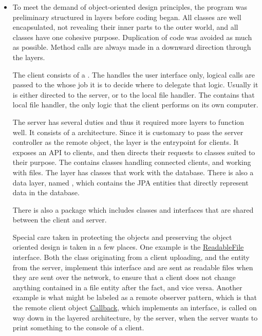 \documentclass[a4paper]{scrartcl}
\begin{document}
\begin{itemize}
    \item To meet the demand of object-oriented design principles, the program was preliminary structured in layers before coding began. All classes are well encapsulated, not revealing their inner parts to the outer world, and all classes have one cohesive purpose. Duplication of code was avoided as much as possible. Method calls are always made in a downward direction through the layers.

        The client consists of a . The  handles the user interface only, logical calls are passed to the  whose job it is to decide where to delegate that logic. Usually it is either directed to the server, or to the local file handler. The  contains that local file handler, the only logic that the client performs on its own computer.

        The server has several duties and thus it required more layers to function well. It consists of a  architecture. Since it is customary to pass the server controller as the remote object, the  layer is the entrypoint for clients. It exposes an API to clients, and then directs their requests to classes suited to their purpose. The  contains classes handling connected clients, and working with files. The  layer has classes that work with the database. There is also a data layer, named , which contains the JPA entities that directly represent data in the database.

        There is also a  package which includes classes and interfaces that are shared between the client and server.

        Special care taken in protecting the objects and preserving the object oriented design is taken in a few places. One example is the \href{https://github.com/fongie/Filehandler/blob/master/common/common/ReadableFile.java}{ReadableFile} interface. Both the  class originating from a client uploading, and the  entity from the server, implement this interface and are sent as readable files when they are sent over the network, to ensure that a client does not change anything contained in a file entity after the fact, and vice versa. Another example is what might be labeled as a remote observer pattern, which is that the remote client object \href{https://github.com/fongie/Filehandler/blob/143ac2e6c4f62b801610bd51a0752c945b97d358/filehandler_client/src/main/java/view/UserInterface.java#L250}{Callback}, which implements an interface, is called on way down in the layered architecture, by the server, when the server wants to print something to the console of a client.
        

\end{itemize}
\end{document}
